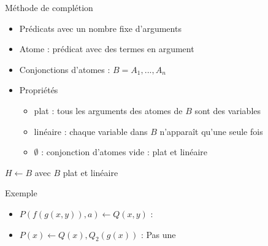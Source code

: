 \begin{frame}{Méthode de complétion}
  \begin{center}
  \end{center}
\end{frame}

\begin{frame}{\csclause}
  \begin{itemize}[<+->]
  \item Prédicats avec un nombre fixe d'arguments
  \item Atome : prédicat avec des termes en argument
  \item Conjonctions d'atomes : $B = A_1, ..., A_n$
  \item Propriétés
    \begin{itemize}
    \item plat : tous les arguments des atomes de $B$ sont des variables
    \item linéaire : chaque variable dans $B$ n'apparaît qu'une seule fois
    \item $\emptyset$ : conjonction d'atomes vide : plat et linéaire
    \end{itemize}
  \end{itemize}
  \begin{block}{\csclause}
    $H \leftarrow B$ avec $B$ plat et linéaire
  \end{block}
  \begin{exampleblock}{Exemple}
    \begin{itemize}
     \item $P(f(g(x,y)),a) \leftarrow Q(x,y)$ : \csclause
     \item $P(x) \leftarrow Q(x),Q_2(g(x))$ : Pas une \csclause
    \end{itemize}
  \end{exampleblock}
\end{frame}

